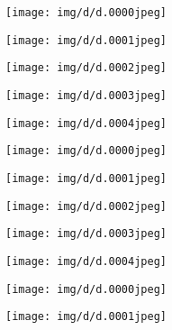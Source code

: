 \begin{figure*}
{\begin{minipage}[t]{0\linewidth }
		\texttt{[image: img/d/d.0000jpeg]}
		\end{minipage}
		\begin{minipage}[t]{0\linewidth }
		\centering
		\texttt{[image: img/d/d.0001jpeg]}
		\end{minipage}
		\begin{minipage}[t]{0\linewidth }
		\centering
		\texttt{[image: img/d/d.0002jpeg]}
		\end{minipage}
		\begin{minipage}[t]{0\linewidth }
		\centering
		\texttt{[image: img/d/d.0003jpeg]}
		\end{minipage}
		\begin{minipage}[t]{0\linewidth }
		\centering
		\texttt{[image: img/d/d.0004jpeg]}
		\end{minipage}
	\vspace{-3mm}
	\setcounter{ subfigure }{0}
		\begin{minipage}[t]{0\linewidth }
		\centering
		\texttt{[image: img/d/d.0000jpeg]}
		\end{minipage}
		\begin{minipage}[t]{0\linewidth }
		\centering
		\texttt{[image: img/d/d.0001jpeg]}
		\end{minipage}
		\begin{minipage}[t]{0\linewidth }
		\centering
		\texttt{[image: img/d/d.0002jpeg]}
		\end{minipage}
		\begin{minipage}[t]{0\linewidth }
		\centering
		\texttt{[image: img/d/d.0003jpeg]}
		\end{minipage}
		\begin{minipage}[t]{0\linewidth }
		\centering
		\texttt{[image: img/d/d.0004jpeg]}
		\end{minipage}
	\vspace{-3mm}
	\setcounter{ subfigure }{0}
		\begin{minipage}[t]{0\linewidth }
		\centering
		\texttt{[image: img/d/d.0000jpeg]}
		\end{minipage}
		\begin{minipage}[t]{0\linewidth }
		\centering
		\texttt{[image: img/d/d.0001jpeg]}

\end{minipage}}
\end{figure*}
